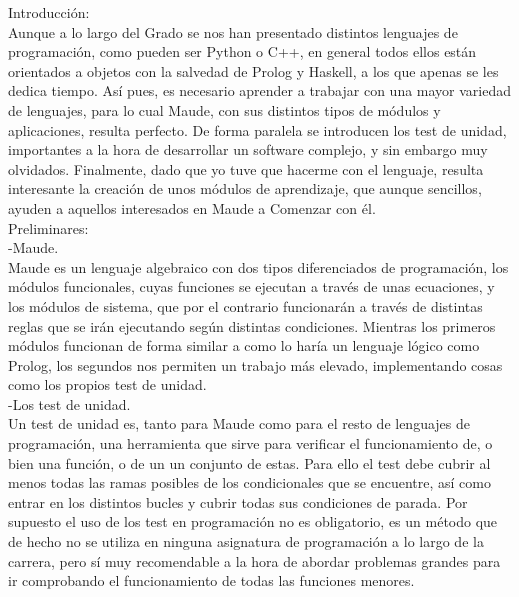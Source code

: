 
Introducción: \\

Aunque a lo largo del Grado se nos han presentado distintos lenguajes de programación, como pueden ser Python o C++, en general todos ellos están orientados a objetos con la salvedad de Prolog y Haskell, a los que apenas se les dedica tiempo. Así pues, es necesario aprender a trabajar con una mayor variedad de lenguajes, para lo cual Maude, con sus distintos tipos de módulos y aplicaciones, resulta perfecto. De forma paralela se introducen los test de unidad, importantes a la hora de desarrollar un software complejo, y sin embargo muy olvidados. Finalmente, dado que yo tuve que hacerme con el lenguaje, resulta interesante la creación de unos módulos de aprendizaje, que aunque sencillos, ayuden a aquellos interesados en Maude a Comenzar con él. \\

Preliminares: \\

-Maude. \\

Maude es un lenguaje algebraico con dos tipos diferenciados de programación, los módulos funcionales, cuyas funciones se ejecutan a través de unas ecuaciones, y los módulos de sistema, que por el contrario funcionarán a través de distintas reglas que se irán ejecutando según distintas condiciones. Mientras los primeros módulos funcionan de forma similar a como lo haría un lenguaje lógico como Prolog, los segundos nos permiten un trabajo más elevado, implementando cosas como los propios test de unidad.\\

-Los test de unidad.\\

Un test de unidad es, tanto para Maude como para el resto de lenguajes de programación, una herramienta que sirve para verificar el funcionamiento de, o bien una función, o de un un conjunto de estas. Para ello el test debe cubrir al menos todas las ramas posibles de los condicionales que se encuentre, así como entrar en los distintos bucles y cubrir todas sus condiciones de parada. Por supuesto el uso de los test en programación no es obligatorio, es un método que de hecho no se utiliza en ninguna asignatura de programación a lo largo de la carrera, pero sí muy recomendable a la hora de abordar problemas grandes para ir comprobando el funcionamiento de todas las funciones menores.\\

